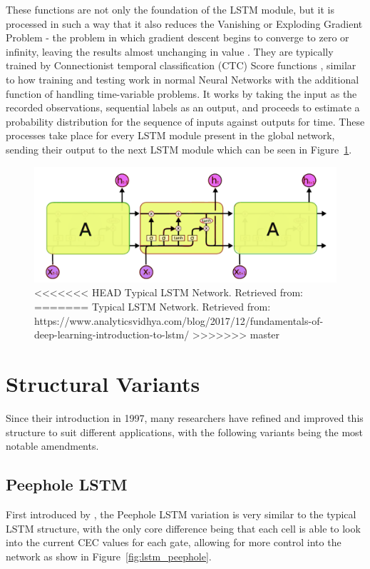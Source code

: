 These functions are not only the foundation of the LSTM module, but it is processed in such a way that it also reduces the Vanishing or Exploding Gradient Problem  - the problem in which gradient descent begins to converge to zero or infinity, leaving the results almost unchanging in value \citep{chapter-gradient-flow-2001}. They are typically trained by Connectionist temporal classification (CTC) Score functions \citep{Graves:2006:CTC:1143844.1143891}, similar to how training and testing work in normal Neural Networks with the additional function of handling time-variable problems. It works by taking the input as the recorded observations, sequential labels as an output, and proceeds to estimate a probability distribution for the sequence of inputs against outputs for time. These processes take place for every LSTM module present in the global network, sending their output to the next LSTM module which can be seen in Figure~\ref{fig:lstm_full}.

\begin{figure}
	\centering
	\includegraphics[width=0.6\linewidth]{graphics/lstm/lstm_full.png}
	\caption{
<<<<<<< HEAD
		Typical LSTM Network. Retrieved from: \citet{strivastava_2017}
=======
		Typical LSTM Network. Retrieved from: https://www.analyticsvidhya.com/blog/2017/12/fundamentals-of-deep-learning-introduction-to-lstm/
>>>>>>> master
	}
	\label{fig:lstm_full}
\end{figure}

\section{Structural Variants}
Since their introduction in 1997, many researchers have refined and improved this structure to suit different applications, with the following variants being the most notable amendments.

\subsection{Peephole LSTM}
First introduced by \citet{Gers:2003:LPT:944919.944925}, the Peephole LSTM variation is very similar to the typical LSTM structure, with the only core difference being that each cell is able to look into the current CEC values for each gate, allowing for more control into the network as show in Figure~\ref{fig:lstm_peephole}.

